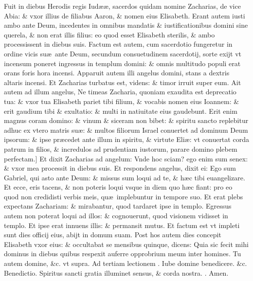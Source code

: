 \documentclass[a5paper,10pt]{book}
\makeatletter
\def\leftmarginnote{%
	\lrmarginnote{\hskip -\marginparsep \hskip -6.5em}}
\def\rightmarginnote{%
	\lrmarginnote{\hskip\columnwidth \hskip -1em}}
\DeclareRobustCommand{\Vbar}{\vers@resp{-0.1em}{V}}
\DeclareRobustCommand{\Rbar}{\vers@resp{0pt}{R}}
\newcommand{\vers@resp@sym}{\raisebox{0.2ex}{\rotatebox[origin=c]{-20}{$\m@th\rceil$}}}
\newcommand{\vers@resp}[2]{%
  {\ooalign{\hidewidth\kern#1\vers@resp@sym\hidewidth\cr#2\cr}}%
}%
\def\ae{æ}
\makeatother
\begin{document}
\begin{multicols*}{2}
Fuit\leftmarginnote{\begin{flushright}ca. 1.\\A\end{flushright}} in diebus Herodis regis Iud\ae \ae , sacerdos quidam nomine Zacharias, de vice Abia: \& vxor illius de filiabus Aaron, \& nomen eius Elisabeth.
Erant autem iusti ambo ante Deum, incedentes in omnibus mandatis \& iustificationibus domini sine querela, \& non erat illis filius: eo quod esset Elisabeth sterilis, \& ambo processissent in diebus suis.
Factum est autem, cum sacerdotio fungeretur in ordine vicis su\ae \ ante Deum, secundum consuetudinem sacerdotij, sorte exijt vt incensum poneret ingressus in templum domini: \& omnis multitudo populi erat orans foris hora incensi.
Apparuit autem illi angelus domini, stans a dextris altaris incensi.
Et Zacharias turbatus est, videns: \& timor irruit super eum.
Ait autem ad illum angelus, Ne timeas Zacharia, quoniam exaudita est deprecatio tua: \& vxor tua Elisabeth pariet tibi filium, \& vocabis nomen eius Ioannem: \& erit gaudium tibi \& exultatio: \& multi in natiuitate eius gaudebunt.
Erit enim magnus coram domino: \& vinum \& siceram non bibet: \& spiritu sancto replebitur adhuc ex vtero matris su\ae :
\& multos filiorum Israel conuertet ad dominum Deum ipsorum: \& ipse pr\ae cedet ante illum in spiritu, \& virtute Eli\ae : vt conuertat corda patrum in filios, \& incredulos ad prudentiam iustorum, parare domino plebem perfectam.]
Et\rightmarginnote{B} dixit Zacharias ad angelum: Vnde hoc sciam? ego enim sum senex: \& vxor mea processit in diebus suis.
Et respondens angelus, dixit ei: Ego sum Gabriel, qui asto ante Deum: \& missus sum loqui ad te, \& h\ae c tibi euangelizare.
Et ecce, eris tacens, \& non poteris loqui vsque in diem quo h\ae c fiant: pro eo quod non credidisti verbis meis, qu\ae \ implebuntur in tempore suo.
Et erat plebs expectans Zachariam: \& mirabantur, quod tardaret ipse in templo.
Egressus autem non poterat loqui ad illos: \& cognouerunt, quod visionem vidisset in templo.
Et ipse erat innuens illis: \& permansit mutus.
Et factum est vt impleti sunt dies officij eius, abijt in domum suam.
Post hos autem dies concepit Elisabeth vxor eius: \& occultabat se mensibus quinque, dicens: Quia sic fecit mihi dominus in diebus quibus respexit auferre opprobrium meum inter homines.
\newline Tu autem domine, \color{red} \&c. vt supra. \color{black}
\newline {} \color{red} Ad tertiam lectionem \Vbar . \color{black} Iube domine benedicere. \color{red} \&c. Benedictio. \color{black} Spiritus sancti gratia illuminet sensus, \& corda nostra. \color{red} \Rbar . \color{black} Amen.

\end{multicols*}
\end{document}
